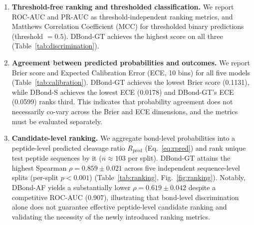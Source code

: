 \begin{enumerate}
    \item \textbf{Threshold-free ranking and thresholded classification.}
    We report ROC-AUC and PR-AUC as threshold-independent ranking metrics,
    and Matthews Correlation Coefficient (MCC) for thresholded binary
    predictions (threshold $=0.5$). DBond-GT achieves the highest score on
    all three (Table~\ref{tab:discrimination}).

    \item \textbf{Agreement between predicted probabilities and outcomes.}
    We report Brier score and Expected Calibration Error (ECE, 10 bins)
    for all five models (Table~\ref{tab:calibration}). DBond-GT achieves
    the lowest Brier score (0.1131), while DBond-S achieves the lowest
    ECE (0.0178) and DBond-GT's ECE (0.0599) ranks third. This indicates
    that probability agreement does not necessarily co-vary across the
    Brier and ECE dimensions, and the metrics must be evaluated
    separately.

    \item \textbf{Candidate-level ranking.} We aggregate bond-level
    probabilities into a peptide-level predicted cleavage ratio
    $R_{\text{pred}}$ (Eq.~\ref{eq:rpred}) and rank unique test peptide
    sequences by it ($n \approx 103$ per split). DBond-GT attains the
    highest Spearman $\rho = 0.859 \pm 0.021$ across five independent
    sequence-level splits (per-split $p < 0.001$)
    (Table~\ref{tab:ranking}, Fig.~\ref{fig:ranking}). Notably, DBond-AF
    yields a substantially lower $\rho = 0.619 \pm 0.042$ despite a
    competitive ROC-AUC (0.907), illustrating that bond-level
    discrimination alone does not guarantee effective peptide-level
    candidate ranking and validating the necessity of the newly
    introduced ranking metrics.
\end{enumerate}
